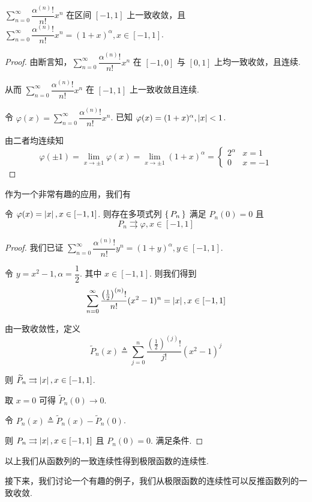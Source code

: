 \begin{inference}
    $\sum\limits_{n=0}^\infty\dfrac{\alpha^{(n)}!}{n!}x^n$ 在区间 $[-1,1]$ 上一致收敛，且 $\sum\limits_{n=0}^\infty\dfrac{\alpha^{(n)}!}{n!}x^n=(1+x)^\alpha,x\in[-1,1]$.
\end{inference}
\begin{proof}
    由断言知，$\sum\limits_{n=0}^\infty\dfrac{\alpha^{(n)}!}{n!}x^n$ 在 $[-1,0]$ 与 $[0,1]$ 上均一致收敛，且连续.

    从而 $\sum\limits_{n=0}^\infty\dfrac{\alpha^{(n)}!}{n!}x^n$ 在 $[-1,1]$ 上一致收敛且连续.

    令 $\varphi(x)=\sum\limits_{n=0}^\infty\dfrac{\alpha^{(n)}!}{n!}x^n$. 已知 $\varphi(x)=(1+x)^\alpha,\left\lvert{x}\right\rvert<1$.

    由二者均连续知
$$
\varphi(\pm 1)=\lim_{x\to\pm 1}\varphi(x)=\lim_{x\to\pm 1}(1+x)^\alpha=\begin{cases}
    2^\alpha & x=1\\
    0 & x=-1
\end{cases}
$$
\end{proof}

作为一个非常有趣的应用，我们有

\begin{inference}
    令 $\varphi(x)=\left\lvert{x}\right\rvert,x\in[-1,1]$. 则存在多项式列 $\set{P_n}$ 满足 $P_n(0)=0$ 且
$$
P_n\rightrightarrows\varphi,x\in[-1,1]
$$
\end{inference}
\begin{proof}
    我们已证 $\sum\limits_{n=0}^\infty\dfrac{\alpha^{(n)}!}{n!}y^n=(1+y)^\alpha,y\in[-1,1]$.

    令 $y=x^2-1,\alpha=\dfrac{1}{2}$. 其中 $x\in[-1,1]$. 则我们得到
$$
\sum\limits_{n=0}^\infty\dfrac{\left(\frac{1}{2}\right)^{(n)}!}{n!}(x^2-1)^n=\left\lvert{x}\right\rvert,x\in[-1,1]
$$

    由一致收敛性，定义
$$
\widetilde{P}_n(x)\triangleq\sum_{j=0}^n\frac{\left(\frac{1}{2}\right)^{(j)}!}{j!}(x^2-1)^j
$$

    则 $\widetilde{P}_n\rightrightarrows\left\lvert{x}\right\rvert,x\in[-1,1]$.

    取 $x=0$ 可得 $\widetilde{P}_n(0)\to 0$.

    令 $P_n(x)\triangleq\widetilde{P}_n(x)-\widetilde{P}_n(0)$.

    则 $P_n\rightrightarrows\left\lvert{x}\right\rvert,x\in[-1,1]$ 且 $P_n(0)=0$. 满足条件.
\end{proof}

以上我们从函数列的一致连续性得到极限函数的连续性.

接下来，我们讨论一个有趣的例子，我们从极限函数的连续性可以反推函数列的一致收敛.


